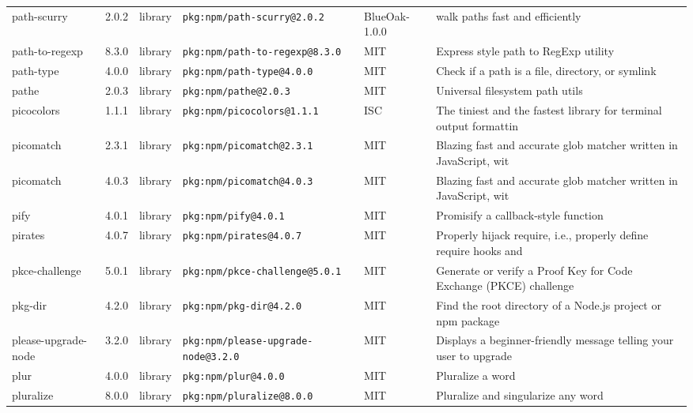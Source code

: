 \documentclass[11pt,a4paper]{article}
\begin{document}
\begin{longtable}{|p{4cm}|p{2cm}|p{1.6cm}|p{5cm}|p{1.5cm}|p{3.5cm}|}
\raggedright path-scurry & 2.0.2 & library & \small\texttt{pkg:npm/path-scurry@2.0.2} & BlueOak-1.0.0 & \small walk paths fast and efficiently \\
\raggedright path-to-regexp & 8.3.0 & library & \small\texttt{pkg:npm/path-to-regexp@8.3.0} & MIT & \small Express style path to RegExp utility \\
\raggedright path-type & 4.0.0 & library & \small\texttt{pkg:npm/path-type@4.0.0} & MIT & \small Check if a path is a file, directory, or symlink \\
\raggedright pathe & 2.0.3 & library & \small\texttt{pkg:npm/pathe@2.0.3} & MIT & \small Universal filesystem path utils \\
\raggedright picocolors & 1.1.1 & library & \small\texttt{pkg:npm/picocolors@1.1.1} & ISC & \small The tiniest and the fastest library for terminal output formattin \\
\raggedright picomatch & 2.3.1 & library & \small\texttt{pkg:npm/picomatch@2.3.1} & MIT & \small Blazing fast and accurate glob matcher written in JavaScript, wit \\
\raggedright picomatch & 4.0.3 & library & \small\texttt{pkg:npm/picomatch@4.0.3} & MIT & \small Blazing fast and accurate glob matcher written in JavaScript, wit \\
\raggedright pify & 4.0.1 & library & \small\texttt{pkg:npm/pify@4.0.1} & MIT & \small Promisify a callback-style function \\
\raggedright pirates & 4.0.7 & library & \small\texttt{pkg:npm/pirates@4.0.7} & MIT & \small Properly hijack require, i.e., properly define require hooks and  \\
\raggedright pkce-challenge & 5.0.1 & library & \small\texttt{pkg:npm/pkce-challenge@5.0.1} & MIT & \small Generate or verify a Proof Key for Code Exchange (PKCE) challenge \\
\raggedright pkg-dir & 4.2.0 & library & \small\texttt{pkg:npm/pkg-dir@4.2.0} & MIT & \small Find the root directory of a Node.js project or npm package \\
\raggedright please-upgrade-node & 3.2.0 & library & \small\texttt{pkg:npm/please-upgrade-node@3.2.0} & MIT & \small Displays a beginner-friendly message telling your user to upgrade \\
\raggedright plur & 4.0.0 & library & \small\texttt{pkg:npm/plur@4.0.0} & MIT & \small Pluralize a word \\
\raggedright pluralize & 8.0.0 & library & \small\texttt{pkg:npm/pluralize@8.0.0} & MIT & \small Pluralize and singularize any word \\

\end{longtable}
\end{document}
